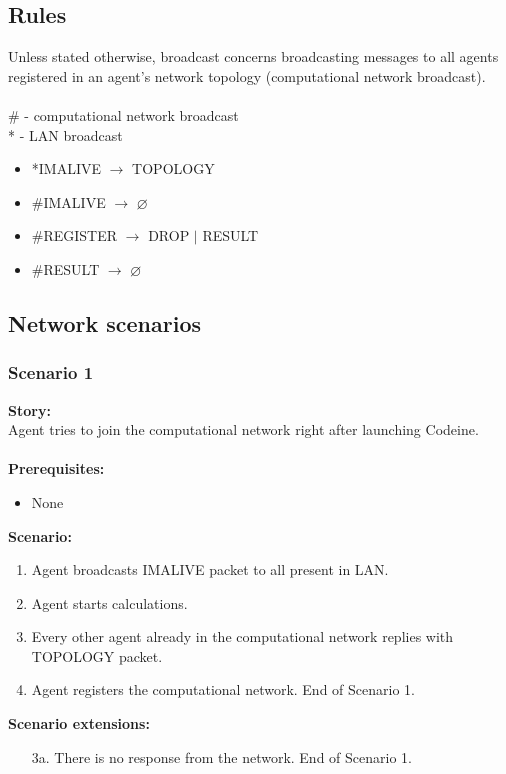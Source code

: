 \documentclass{article}
\begin{document}
\subsection{Rules}
Unless stated otherwise, broadcast concerns broadcasting messages to all agents registered in an agent's network topology (computational network broadcast). \\\\
\# - computational network broadcast\\
* - LAN broadcast
\begin{itemize}
    \item *IMALIVE $\rightarrow$ TOPOLOGY
    \item \#{}IMALIVE $\rightarrow$ $\varnothing$
    \item \#{}REGISTER $\rightarrow$ DROP $\vert$ RESULT
    \item \#{}RESULT $\rightarrow$ $\varnothing$
\end{itemize}

\subsection{Network scenarios}
\subsubsection{Scenario 1}
\noindent\textbf{Story:} \\
Agent tries to join the computational network right after launching Codeine. \\\\
\textbf{Prerequisites:}
\begin{itemize}
    \item None
\end{itemize}
\textbf{Scenario:}
\begin{enumerate}
    \item Agent broadcasts IMALIVE packet to all present in LAN.
    \item Agent starts calculations.
    \item Every other agent already in the computational network replies with TOPOLOGY packet.
    \item Agent registers the computational network. End of Scenario 1.
\end{enumerate}
\textbf{Scenario extensions:}
\begin{itemize}
    \item[3a.] There is no response from the network. End of Scenario 1.
\end{itemize}
\end{document}
